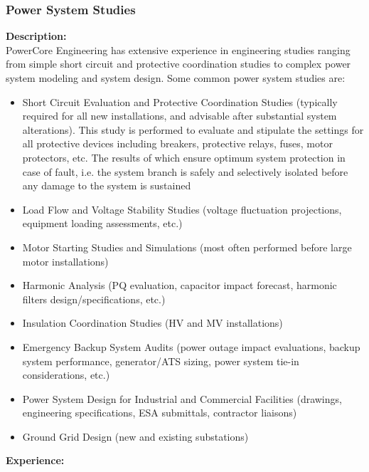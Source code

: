 \pagebreak

\subsubsection{Power System Studies}
\label{ETQ:PCEExp:PSS}


\noindent \textbf{Description:}\\
	

PowerCore Engineering has extensive experience in engineering studies ranging from simple short circuit and protective coordination studies to complex power system modeling and system design. Some common power system studies are:
\begin{itemize}
	\item Short Circuit Evaluation and Protective Coordination Studies (typically required for all new installations, and advisable after substantial system alterations). This study is performed to evaluate and stipulate the settings for all protective devices including breakers, protective relays, fuses, motor protectors, etc. The results of which ensure optimum system protection in case of fault, i.e. the system branch is safely and selectively isolated before any damage to the system is sustained
	\item Load Flow and Voltage Stability Studies (voltage fluctuation projections, equipment loading assessments, etc.)
	\item Motor Starting Studies and Simulations (most often performed before large motor installations)
	\item Harmonic Analysis (PQ evaluation, capacitor impact forecast, harmonic filters design/specifications, etc.)
	\item Insulation Coordination Studies (HV and MV installations)
	\item Emergency Backup System Audits (power outage impact evaluations, backup system performance, generator/ATS sizing, power system tie-in considerations, etc.)
	\item Power System Design for Industrial and Commercial Facilities (drawings, engineering specifications, ESA submittals, contractor liaisons)
	\item Ground Grid Design (new and existing substations)
\end{itemize}

\vspace{10 mm}
\noindent \textbf{Experience:}

